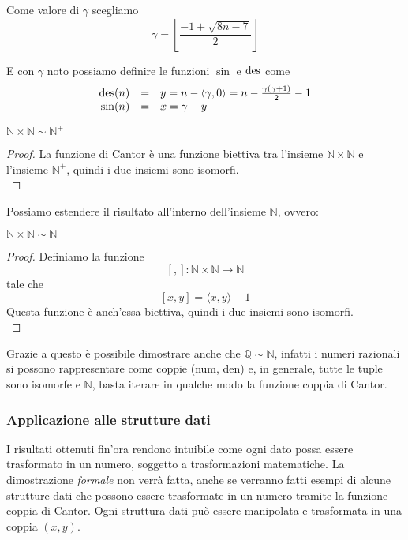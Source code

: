 Come valore di $\gamma$ scegliamo
$$ \gamma = \left\lfloor \frac{-1 + \sqrt{8n - 7}}{2} \right\rfloor $$

E con $\gamma$ noto possiamo definire le funzioni $\sin$ e $\operatorname{des}$ come
$$ 
\begin{array}{r c l}
	\operatorname{des}(n) & = & y = n - \langle \gamma, 0 \rangle = n - \frac{\gamma (\gamma + 1)}{2} - 1 \\
	\sin (n) & = & x = \gamma - y
\end{array}
$$

\begin{theor}
	$\mathbb{N} \times \mathbb{N} \sim \mathbb{N}^+$
\end{theor}
\begin{proof}
	La funzione di Cantor è una funzione biettiva tra l'insieme $\mathbb{N} \times \mathbb{N}$ e l'insieme $\mathbb{N}^+$, quindi i due insiemi sono isomorfi.\\
\end{proof}

Possiamo estendere il risultato all'interno dell'insieme $\mathbb{N}$, ovvero:

\begin{theor}
	$\mathbb{N} \times \mathbb{N} \sim \mathbb{N}$
\end{theor}
\begin{proof}
	Definiamo la funzione 
	$$ [,]: \mathbb{N} \times \mathbb{N} \rightarrow \mathbb{N} $$
	tale che
	$$ [x,y] = \langle x,y \rangle - 1$$
	Questa funzione è anch'essa biettiva, quindi i due insiemi sono isomorfi.\\
\end{proof}

Grazie a questo è possibile dimostrare anche che $\mathbb{Q} \sim \mathbb{N}$, infatti i numeri razionali si possono rappresentare come coppie (num, den) e, in generale, tutte le tuple sono isomorfe e $\mathbb{N}$, basta iterare in qualche modo la funzione coppia di Cantor.\\

\subsubsection{Applicazione alle strutture dati}
I risultati ottenuti fin'ora rendono intuibile come ogni dato possa essere trasformato in un numero, soggetto a trasformazioni matematiche. La dimostrazione \textit{formale} non verrà fatta, anche se verranno fatti esempi di alcune strutture dati che possono essere trasformate in un numero tramite la funzione coppia di Cantor. Ogni struttura dati può essere manipolata e trasformata in una coppia $(x,y)$.\\

